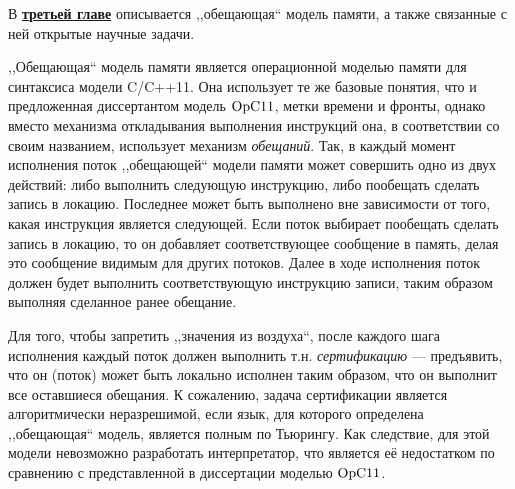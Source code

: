 
В \underline{\textbf{третьей главе}}  описывается ,,обещающая`` модель памяти, а также связанные с ней  открытые  научные задачи.

,,Обещающая`` модель памяти является операционной моделью памяти для синтаксиса модели C/C++11.
Она использует те же базовые понятия, что и предложенная диссертантом модель $\mathrm{OpC11}$,
метки времени и фронты, однако вместо механизма откладывания выполнения инструкций она,
в соответствии со своим названием, использует механизм \emph{обещаний}. Так, в каждый момент исполнения поток
,,обещающей`` модели памяти может совершить одно из двух действий: либо выполнить следующую инструкцию,
либо пообещать сделать запись в локацию. Последнее может быть выполнено вне зависимости от того, какая
инструкция является следующей.
Если поток выбирает пообещать сделать запись в локацию, то он добавляет соответствующее сообщение в память,
делая это сообщение видимым для других потоков. Далее в ходе исполнения поток должен будет выполнить соответствующую инструкцию записи, таким образом выполняя сделанное ранее обещание.

Для того, чтобы запретить ,,значения из воздуха``, после каждого шага исполнения каждый поток должен выполнить
т.н. \emph{сертификацию} --- предъявить, что он (поток) может быть локально исполнен таким образом, что
он выполнит все оставшиеся обещания. К сожалению, задача сертификации является алгоритмически неразрешимой, если
язык, для которого определена ,,обещающая`` модель, является полным по Тьюрингу. Как следствие, для
этой модели невозможно разработать интерпретатор, что является её недостатком по сравнению с представленной в
диссертации моделью $\mathrm{OpC11}$.

